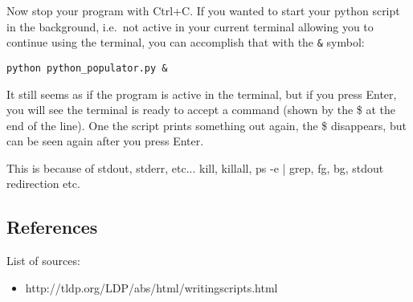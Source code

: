 \documentclass[a4paper]{article}
\begin{document}
Now stop your program with Ctrl+C. If you wanted to start your python script in the background, i.e.\ not active in your current terminal allowing you to continue using the terminal, you can accomplish that with the \texttt{\&} symbol:
\begin{lstlisting}
python python_populator.py &
\end{lstlisting}

It still seems as if the program is active in the terminal, but if you press Enter, you will see the terminal is ready to accept a command (shown by the \$ at the end of the line). One the script prints something out again, the \$ disappears, but can be seen again after you press Enter. 

This is because of stdout, stderr, etc...
kill, killall, ps -e | grep, fg, bg, stdout redirection etc.

\subsection{References}

List of sources:

\begin{itemize}
	
    \item http://tldp.org/LDP/abs/html/writingscripts.html
    
\end{itemize}
\end{document}

